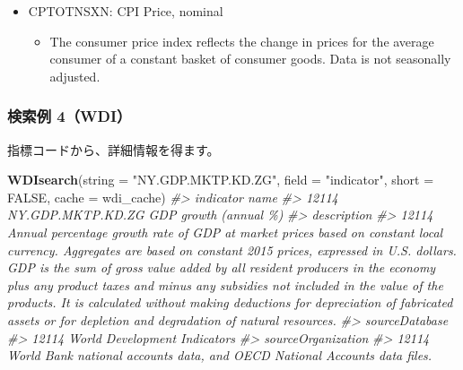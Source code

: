 \documentclass[
  xelatex, ja=standard]{bxjsbook}
\newenvironment{Shaded}{\begin{snugshade}}{\end{snugshade}}
\newcommand{\AttributeTok}[1]{\textcolor[rgb]{0.13,0.29,0.53}{#1}}
\newcommand{\CommentTok}[1]{\textcolor[rgb]{0.56,0.35,0.01}{\textit{#1}}}
\newcommand{\ConstantTok}[1]{\textcolor[rgb]{0.56,0.35,0.01}{#1}}
\newcommand{\FunctionTok}[1]{\textcolor[rgb]{0.13,0.29,0.53}{\textbf{#1}}}
\newcommand{\NormalTok}[1]{#1}
\newcommand{\StringTok}[1]{\textcolor[rgb]{0.31,0.60,0.02}{#1}}
\providecommand{\tightlist}{%
  \setlength{\itemsep}{0pt}\setlength{\parskip}{0pt}}
\theoremstyle{definition}
\theoremstyle{definition}
\theoremstyle{definition}
\theoremstyle{definition}
\theoremstyle{remark}
\begin{document}
\begin{itemize}
\tightlist
\item
  CPTOTNSXN: CPI Price, nominal

  \begin{itemize}
  \tightlist
  \item
    The consumer price index reflects the change in prices for the average consumer of a constant basket of consumer goods. Data is not seasonally adjusted.
  \end{itemize}
\end{itemize}

\hypertarget{ux691cux7d22ux4f8b-4wdi}{%
\subsubsection{検索例 4（WDI）}\label{ux691cux7d22ux4f8b-4wdi}}

指標コードから、詳細情報を得ます。

\begin{Shaded}
\begin{Highlighting}[]
\FunctionTok{WDIsearch}\NormalTok{(}\AttributeTok{string =} \StringTok{"NY.GDP.MKTP.KD.ZG"}\NormalTok{, }\AttributeTok{field =} \StringTok{"indicator"}\NormalTok{, }\AttributeTok{short =} \ConstantTok{FALSE}\NormalTok{, }\AttributeTok{cache =}\NormalTok{ wdi\_cache)}
\CommentTok{\#\textgreater{}               indicator                  name}
\CommentTok{\#\textgreater{} 12114 NY.GDP.MKTP.KD.ZG GDP growth (annual \%)}
\CommentTok{\#\textgreater{}                                                                                                                                                                                                                                                                                                                                                                                                                                                                           description}
\CommentTok{\#\textgreater{} 12114 Annual percentage growth rate of GDP at market prices based on constant local currency. Aggregates are based on constant 2015 prices, expressed in U.S. dollars. GDP is the sum of gross value added by all resident producers in the economy plus any product taxes and minus any subsidies not included in the value of the products. It is calculated without making deductions for depreciation of fabricated assets or for depletion and degradation of natural resources.}
\CommentTok{\#\textgreater{}                     sourceDatabase}
\CommentTok{\#\textgreater{} 12114 World Development Indicators}
\CommentTok{\#\textgreater{}                                                              sourceOrganization}
\CommentTok{\#\textgreater{} 12114 World Bank national accounts data, and OECD National Accounts data files.}
\end{Highlighting}
\end{Shaded}
\end{document}

